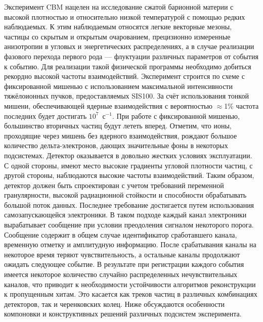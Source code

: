\bigskip

Эксперимент CBM нацелен на исследование сжатой барионной материи с высокой плотностью и относительно низкой температурой с помощью редких наблюдаемых. К этим наблюдаемым относятся легкие векторные мезоны, частицы со скрытым и открытым очарованием, прецизионно измеренные анизотропии в угловых и энергетических распределениях, а в случае реализации фазового перехода первого рода --- флуктуации различных параметров от события к событию. Для реализации такой физической программы необходимо добиться рекордно высокой частоты взаимодействий. Эксперимент строится по схеме с фиксированной мишенью
с использованием максимальной интенсивности тяжёлоионных пучков, предоставляемых SIS100.
За счёт использования тонкой мишени, обеспечивающей ядерные взаимодействия с вероятностью $\approx$1\% частота последних будет достигать $10^7$~с$^{-1}$. При работе с фиксированной мишенью, большинство вторичных частиц будут лететь вперед. Отметим, что ионы, проходящие через мишень без ядерного взаимодействия, рождают большое количество дельта-электронов, дающих значительные фоны в некоторых подсистемах. Детектор оказывается в довольно жестких условиях эксплуатации. С одной стороны, имеют место высокие градиенты угловой плотности частиц, с другой стороны, наблюдаются высокие частоты взаимодействий. Таким образом, детектор должен быть спроектирован с учетом требований переменной гранулярности, высокой радиационной стойкости и способности обрабатывать большой поток данных. Последнее требование достигается путем использования самозапускающейся электроники. В таком подходе каждый канал электроники вырабатывает сообщение при условии преодоления сигналом некоторого порога. Сообщение содержит в общем случае идентификатор сработавшего канала, временную отметку и амплитудную информацию. После срабатывания каналы на некоторое время теряют чувствительность, а остальные каналы продолжают ожидать следующее событие. В результате при регистрации каждого события имеется некоторое количество случайно распределенных нечувствительных каналов, что приводит к необходимости устойчивости алгоритмов реконструкции к пропущенным хитам. Это касается как треков частиц в различных комбинациях детекторов, так и черенковских колец. Ниже обсуждаются особенности компоновки и конструктивных решений различных подсистем эксперимента.